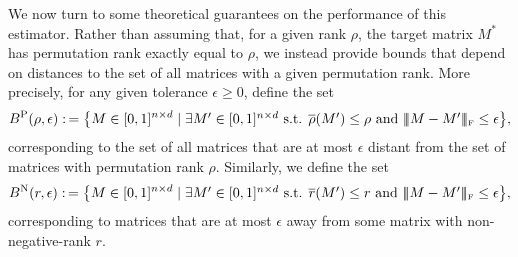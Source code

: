 \documentclass[11pt, hidelinks]{article} %
\newcommand{\matsnorm}[2]{|\!|\!| #1 | \! | \!|_{{#2}}}
\newcommand{\frobnorm}[1]{\ensuremath{\matsnorm{#1}{\mbox{\tiny{F}}}}}
\newcommand{\defn}{\ensuremath{:\,=}}
\newcommand{\numrows}{n}
\newcommand{\numcols}{d}
\newcommand{\wtmatrix}{M}
\newcommand{\wt}{\wtmatrix}
\newcommand{\wtstar}{\wtmatrix^*}
\newcommand{\nnrank}{r}
\newcommand{\permrank}{\rho}
\newcommand{\fnpermrank}[1]{\overline{\permrank}(#1)}
\newcommand{\fnnnrank}[1]{\overline{\nnrank}(#1)}
\newcommand{\oracleeps}{\epsilon}
\newcommand{\frobballperm}[2]{B^{\text{P}}(#1, #2)}
\newcommand{\frobballnn}[2]{B^{\text{N}}(#1, #2)}
\begin{document}
We now turn to some theoretical guarantees on the performance of this
estimator.  Rather than assuming that, for a given rank $\permrank$,
the target matrix $\wtstar$ has permutation rank exactly equal to
$\permrank$, we instead provide bounds that depend on distances to the
set of all matrices with a given permutation rank.  More precisely,
for any given tolerance $\oracleeps \geq 0$, define the set
\begin{align*}
\frobballperm{\permrank}{\oracleeps} \defn \big\{ \wtmatrix \in
             [0,1]^{\numrows \times \numcols} \mid \mbox{$\exists
               \wtmatrix' \in [0,1]^{\numrows \times \numcols}$ s.t.
               $\fnpermrank{\wt'} \leq \permrank$ and $
               \frobnorm{\wtmatrix - \wtmatrix'} \leq \oracleeps$}
             \big \},
\end{align*}
corresponding to the set of all matrices that are at most $\oracleeps$
distant from the set of matrices with permutation rank $\permrank$.
Similarly, we define the set
\begin{align*}
\frobballnn{\nnrank}{\oracleeps} \defn \big\{ \wtmatrix \in
           [0,1]^{\numrows \times \numcols} \mid \mbox{$\exists
             \wtmatrix' \in [0,1]^{\numrows \times \numcols}$ s.t.
             $\fnnnrank{\wt'} \leq \nnrank$ and $ \frobnorm{\wtmatrix
               - \wtmatrix'} \leq \oracleeps$} \big \},
\end{align*}
corresponding to matrices that are at most $\oracleeps$ away from some
matrix with non-negative-rank $\nnrank$.
\end{document}
